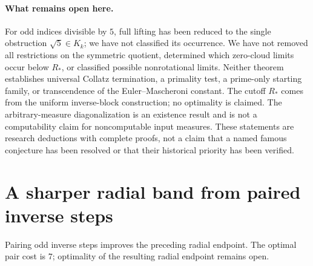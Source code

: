 \documentclass[11pt,a4paper]{article}
\theoremstyle{definition}
\theoremstyle{remark}
\numberwithin{equation}{section}
\begin{document}
\paragraph{What remains open here.}
For odd indices divisible by $5$, full lifting has been reduced to the
single obstruction $\sqrt5\in K_k$; we have not classified its occurrence.
We have not removed all restrictions on the symmetric quotient, determined
which zero-cloud limits occur below $R_*$, or classified possible nonrotational limits.
Neither theorem establishes universal Collatz termination, a primality test,
a prime-only starting family, or transcendence of the Euler--Mascheroni
constant. The cutoff $R_*$ comes from the uniform inverse-block construction;
no optimality is claimed. The arbitrary-measure diagonalization is an
existence result and is not a computability claim for noncomputable input
measures. These statements are research deductions with complete proofs,
not a claim that a named famous conjecture has been resolved or that their
historical priority has been verified.


\section{A sharper radial band from paired inverse steps}
\label{D:sec:paired-radial-band}

Pairing odd inverse steps improves the preceding radial endpoint. The optimal pair cost is $7$; optimality of the resulting radial endpoint remains open.
\end{document}
